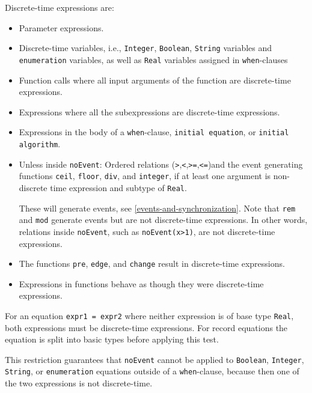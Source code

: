 Discrete-time expressions are:
\begin{itemize}
\item
  Parameter expressions.
\item
  Discrete-time variables, i.e., \lstinline!Integer!, \lstinline!Boolean!, \lstinline!String! variables and
  \lstinline!enumeration! variables, as well as \lstinline!Real! variables assigned in
  \lstinline!when!-clauses
\item
  Function calls where all input arguments of the function are
  discrete-time expressions.
\item
  Expressions where all the subexpressions are discrete-time
  expressions.
\item
  Expressions in the body of a \lstinline!when!-clause, \lstinline!initial equation!, or \lstinline!initial algorithm!.
\item
  Unless inside \lstinline!noEvent!: Ordered relations
  (\lstinline!>!,\lstinline!<!,\lstinline!>=!,\lstinline!<=!)and the event
  generating functions \lstinline!ceil!, \lstinline!floor!, \lstinline!div!, and \lstinline!integer!, if at least one
  argument is non-discrete time expression and subtype of \lstinline!Real!.
  \begin{nonnormative}
  These will generate events, see \autoref{events-and-synchronization}.  Note that \lstinline!rem! and \lstinline!mod! generate events but are not discrete-time
  expressions. In other words, relations inside \lstinline!noEvent!, such as \lstinline!noEvent(x>1)!, are not discrete-time expressions.
  \end{nonnormative}
\item
  The functions \lstinline!pre!, \lstinline!edge!, and \lstinline!change! result in discrete-time
  expressions.
\item
  Expressions in functions behave as though they were discrete-time
  expressions.
\end{itemize}

For an equation \lstinline!expr1 = expr2! where neither expression is of base type
\lstinline!Real!, both expressions must be discrete-time expressions. For record
equations the equation is split into basic types before applying this
test.

\begin{nonnormative}
This restriction guarantees that \lstinline!noEvent! cannot be applied to \lstinline!Boolean!, \lstinline!Integer!, \lstinline!String!, or \lstinline!enumeration!
equations outside of a \lstinline!when!-clause, because then one of the two expressions is not discrete-time.
\end{nonnormative}

